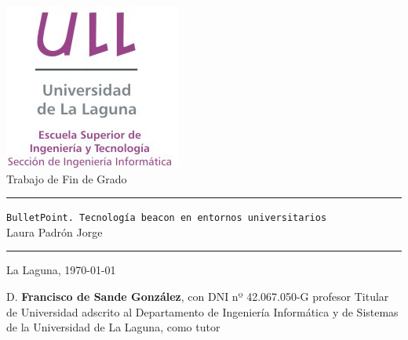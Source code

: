 \documentclass[spanish,a4paper,12pt,oneside]{extreport}
\newcommand{\BulletP}{\texttt{BulletPoint.{ Tecnología beacon en entornos universitarios}}}
\begin{document}
\renewcommand{\lstlistingname}{Listado}%

\pagestyle{empty}
\thispagestyle{empty}


\newcommand{\HRule}{\rule{\linewidth}{1mm}}
\setlength{\parindent}{0mm}
\setlength{\parskip}{0mm}


\begin{center}
\includegraphics[scale=0.8]{images/logo_vertical}\\[10mm]
{\Huge Trabajo de Fin de Grado}
\end{center}

\HRule
\begin{flushright}
        {\Huge \BulletP{}} \\[2.5mm]
        {\Large Laura Padrón Jorge} \\[5mm]


\end{flushright}
\HRule
{}
\begin{center}
  \Large La Laguna, \today
\end{center}

\setlength{\parindent}{5mm}

\newpage
\thispagestyle{empty}

D. {\bf Francisco de Sande González}, con DNI nº 42.067.050-G
profesor
Titular de Universidad
adscrito al Departamento
de Ingeniería Informática y de Sistemas
de la Universidad de La Laguna, como tutor
\end{document}
